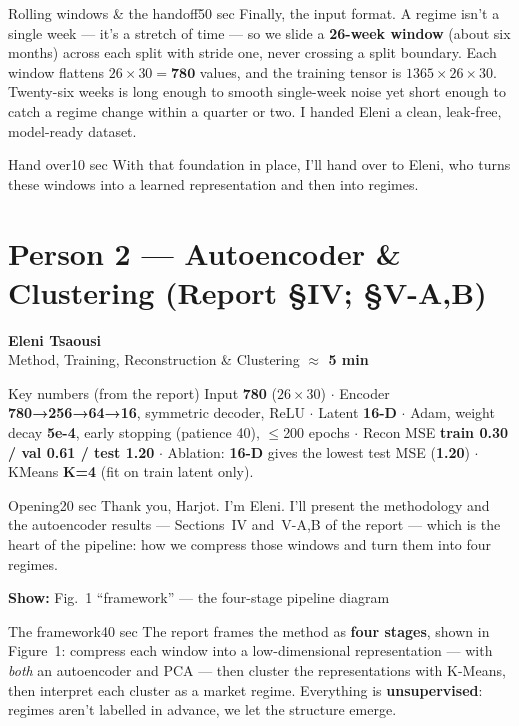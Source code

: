 \documentclass[11pt]{article}
\newcommand{\personbanner}[3]{%
  \begin{tcolorbox}[enhanced, sharp corners, colback=accent, colframe=accent,
      left=14pt, right=14pt, top=10pt, bottom=10pt, before skip=4pt, after skip=10pt]
    {\sffamily\bfseries\LARGE\color{white} #1}\\[2pt]
    {\sffamily\color{white}\large #2}\hfill{\sffamily\bfseries\color{white} #3}
  \end{tcolorbox}}
\newcommand{\setp}[2]{\colorlet{accent}{#1}\colorlet{accentl}{#2}}
\newcommand{\reportref}[1]{{\small\color{ink}\textbf{Show:} #1}}
\begin{document}
\begin{cue}{Rolling windows \& the handoff}{50 sec}
Finally, the input format. A regime isn't a single week --- it's a stretch of
time --- so we slide a \textbf{26-week window} (about six months) across each split
with stride one, never crossing a split boundary. Each window flattens
$26 \times 30 = \textbf{780}$ values, and the training tensor is
$1365 \times 26 \times 30$. Twenty-six weeks is long enough to smooth single-week
noise yet short enough to catch a regime change within a quarter or two. I handed
Eleni a clean, leak-free, model-ready dataset.
\end{cue}

\begin{cue}{Hand over}{10 sec}
With that foundation in place, I'll hand over to Eleni, who turns these windows
into a learned representation and then into regimes.
\end{cue}

\setp{p2}{p2l}
\section{Person 2 — Autoencoder \& Clustering (Report §IV; §V-A,B)}
\personbanner{Eleni Tsaousi}{Method, Training, Reconstruction \& Clustering}{$\approx$ 5 min}

\begin{numbers}{Key numbers (from the report)}
\sffamily\small
Input \textbf{780} ($26\times30$) \;$\cdot$\;
Encoder \textbf{780→256→64→16}, symmetric decoder, ReLU \;$\cdot$\;
Latent \textbf{16-D} \;$\cdot$\;
Adam, weight decay \textbf{5e-4}, early stopping (patience 40), $\le$200 epochs \;$\cdot$\;
Recon MSE \textbf{train 0.30 / val 0.61 / test 1.20} \;$\cdot$\;
Ablation: \textbf{16-D} gives the lowest test MSE (\textbf{1.20}) \;$\cdot$\;
KMeans \textbf{K=4} (fit on train latent only).
\end{numbers}

\begin{cue}{Opening}{20 sec}
Thank you, Harjot. I'm Eleni. I'll present the methodology and the autoencoder
results --- Sections~IV and~V-A,B of the report --- which is the heart of the
pipeline: how we compress those windows and turn them into four regimes.
\end{cue}

\begin{slide}\reportref{Fig.~1 ``framework'' --- the four-stage pipeline diagram}\end{slide}
\begin{cue}{The framework}{40 sec}
The report frames the method as \textbf{four stages}, shown in Figure~1: compress
each window into a low-dimensional representation --- with \emph{both} an
autoencoder and PCA --- then cluster the representations with K-Means, then
interpret each cluster as a market regime. Everything is \textbf{unsupervised}:
regimes aren't labelled in advance, we let the structure emerge.
\end{cue}
\end{document}
